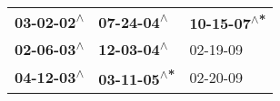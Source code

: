 \begin{supertabular}{lll}
 \textbf{03-02-02\textsuperscript{$\wedge$}} &   \textbf{07-24-04\textsuperscript{$\wedge$}} &  \textbf{10-15-07\textsuperscript{$\wedge$*}} \\
 \textbf{02-06-03\textsuperscript{$\wedge$}} &   \textbf{12-03-04\textsuperscript{$\wedge$}} &                    02-19-09\textsuperscript{} \\
 \textbf{04-12-03\textsuperscript{$\wedge$}} &  \textbf{03-11-05\textsuperscript{$\wedge$*}} &                    02-20-09\textsuperscript{} \\
\end{supertabular}
